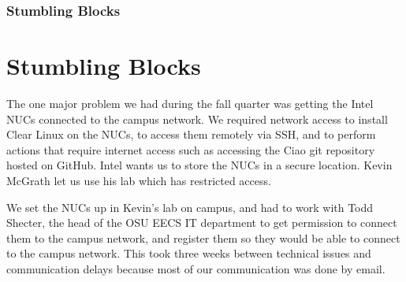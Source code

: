 \documentclass[pdf]{beamer}
\begin{document}
\begin{frame}[allowframebreaks]
	\frametitle{Stumbling Blocks}
	\section{Stumbling Blocks}
	The one major problem we had during the fall quarter was getting the 
	Intel NUCs connected to the campus network.
	We required network access to install Clear Linux on the NUCs, to access
	them remotely via SSH, and to perform actions that require internet access 
	such as accessing the Ciao git repository hosted on GitHub.
	Intel wants us to store the NUCs in a secure location. Kevin McGrath let us 
	use his lab which has restricted access.

	We set the NUCs up in Kevin's lab on campus, and had to work with Todd 
	Shecter, the head of the OSU EECS IT department to get permission to 
	connect them to the campus network, and register them so they would be able 
	to connect to the campus network. This took three weeks between technical 
	issues and communication delays because most of our communication was done 
	by email.


\end{frame}
\end{document}
